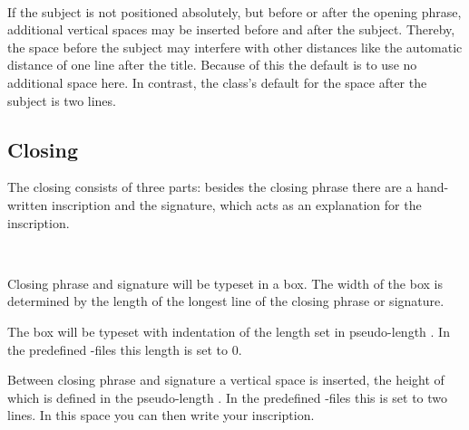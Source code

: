 \begin{Declaration}
  \\
\end{Declaration}
%
%
%
If the subject is not positioned absolutely, but before or after the opening
phrase, additional vertical spaces may be inserted before and after the
subject. Thereby, the space before the subject may interfere with other
distances like the automatic distance of one line after the title. Because of
this the default is to use no additional space here. In contrast, the class's
default for the space after the subject is two lines.%
%
%
%
%
%


\subsection{Closing}
\label{sec:scrlttr2-experts.closing}

The closing consists of three parts: besides the closing phrase there
are a hand-written inscription and the signature, which acts as an
explanation for the inscription.

\begin{Declaration}
  \\
\end{Declaration}
%
%
Closing phrase and signature will be
typeset in a box. The width of the box is determined by the length of the
longest line of the closing phrase or signature.

The box will be typeset with indentation of the length set in pseudo-length
. In the predefined
-files
this length is set to 0.

Between closing phrase and signature a vertical space is inserted, the height
of which is defined in the pseudo-length . In the
predefined
-files
this is set to two lines.  In this space you can then write your inscription.%
%
%
%
%


